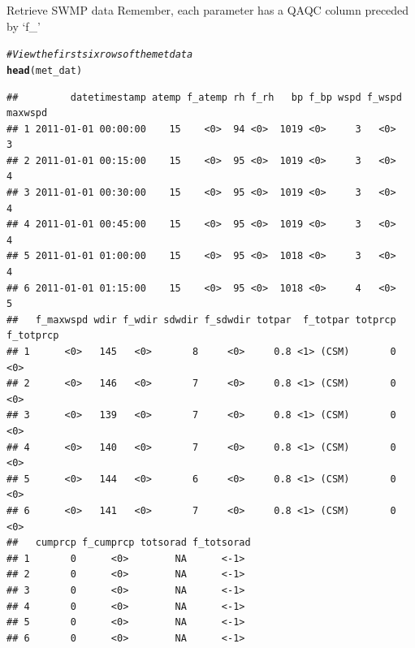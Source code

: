 \documentclass[xcolor=svgnames]{beamer}\usepackage[]{graphicx}\usepackage[]{color}
\makeatletter
\newcommand{\hlcom}[1]{\textcolor[rgb]{0.678,0.584,0.686}{\textit{#1}}}%
\newcommand{\hlstd}[1]{\textcolor[rgb]{0.345,0.345,0.345}{#1}}%
\newcommand{\hlkwd}[1]{\textcolor[rgb]{0.737,0.353,0.396}{\textbf{#1}}}%
\newenvironment{kframe}{%
 \def\at@end@of@kframe{}%
 \ifinner\ifhmode%
  \def\at@end@of@kframe{\end{minipage}}%
  \begin{minipage}{\columnwidth}%
 \fi\fi%
 \def\FrameCommand##1{\hskip\@totalleftmargin \hskip-\fboxsep
 \colorbox{shadecolor}{##1}\hskip-\fboxsep
     \hskip-\linewidth \hskip-\@totalleftmargin \hskip\columnwidth}%
 \MakeFramed {\advance\hsize-\width
   \@totalleftmargin\z@ \linewidth\hsize
   \@setminipage}}%
 {\par\unskip\endMakeFramed%
 \at@end@of@kframe}
\newenvironment{knitrout}{}{} %
\makeatother
\begin{document}
\begin{frame}{Retrieve SWMP data}
Remember, each parameter has a QAQC column preceded by `f\_'
\begin{knitrout}\scriptsize
{}\color{fgcolor}\begin{kframe}
\begin{alltt}
\hlcom{# View the first six rows of the met data}
\hlkwd{head}\hlstd{(met_dat)}
\end{alltt}
\begin{verbatim}
##         datetimestamp atemp f_atemp rh f_rh   bp f_bp wspd f_wspd maxwspd
## 1 2011-01-01 00:00:00    15    <0>  94 <0>  1019 <0>     3   <0>        3
## 2 2011-01-01 00:15:00    15    <0>  95 <0>  1019 <0>     3   <0>        4
## 3 2011-01-01 00:30:00    15    <0>  95 <0>  1019 <0>     3   <0>        4
## 4 2011-01-01 00:45:00    15    <0>  95 <0>  1019 <0>     3   <0>        4
## 5 2011-01-01 01:00:00    15    <0>  95 <0>  1018 <0>     3   <0>        4
## 6 2011-01-01 01:15:00    15    <0>  95 <0>  1018 <0>     4   <0>        5
##   f_maxwspd wdir f_wdir sdwdir f_sdwdir totpar  f_totpar totprcp f_totprcp
## 1      <0>   145   <0>       8     <0>     0.8 <1> (CSM)       0      <0> 
## 2      <0>   146   <0>       7     <0>     0.8 <1> (CSM)       0      <0> 
## 3      <0>   139   <0>       7     <0>     0.8 <1> (CSM)       0      <0> 
## 4      <0>   140   <0>       7     <0>     0.8 <1> (CSM)       0      <0> 
## 5      <0>   144   <0>       6     <0>     0.8 <1> (CSM)       0      <0> 
## 6      <0>   141   <0>       7     <0>     0.8 <1> (CSM)       0      <0> 
##   cumprcp f_cumprcp totsorad f_totsorad
## 1       0      <0>        NA      <-1> 
## 2       0      <0>        NA      <-1> 
## 3       0      <0>        NA      <-1> 
## 4       0      <0>        NA      <-1> 
## 5       0      <0>        NA      <-1> 
## 6       0      <0>        NA      <-1>
\end{verbatim}
\end{kframe}
\end{knitrout}
\end{frame}
\end{document}
